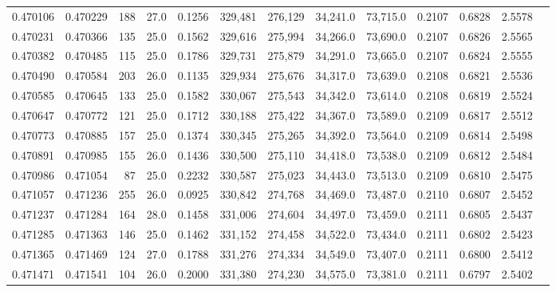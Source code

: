 \begin{tabular}{rrrrrrrrrrrrr}
0.470106 & 0.470229 &   188 & 27.0 &                                     0.1256 & 329,481 & 276,129 &  34,241.0 &  73,715.0 & 0.2107 & 0.6828 & 2.5578 \\
0.470231 & 0.470366 &   135 & 25.0 &                                     0.1562 & 329,616 & 275,994 &  34,266.0 &  73,690.0 & 0.2107 & 0.6826 & 2.5565 \\
0.470382 & 0.470485 &   115 & 25.0 &                                     0.1786 & 329,731 & 275,879 &  34,291.0 &  73,665.0 & 0.2107 & 0.6824 & 2.5555 \\
0.470490 & 0.470584 &   203 & 26.0 &                                     0.1135 & 329,934 & 275,676 &  34,317.0 &  73,639.0 & 0.2108 & 0.6821 & 2.5536 \\
0.470585 & 0.470645 &   133 & 25.0 &                                     0.1582 & 330,067 & 275,543 &  34,342.0 &  73,614.0 & 0.2108 & 0.6819 & 2.5524 \\
0.470647 & 0.470772 &   121 & 25.0 &                                     0.1712 & 330,188 & 275,422 &  34,367.0 &  73,589.0 & 0.2109 & 0.6817 & 2.5512 \\
0.470773 & 0.470885 &   157 & 25.0 &                                     0.1374 & 330,345 & 275,265 &  34,392.0 &  73,564.0 & 0.2109 & 0.6814 & 2.5498 \\
0.470891 & 0.470985 &   155 & 26.0 &                                     0.1436 & 330,500 & 275,110 &  34,418.0 &  73,538.0 & 0.2109 & 0.6812 & 2.5484 \\
0.470986 & 0.471054 &    87 & 25.0 &                                     0.2232 & 330,587 & 275,023 &  34,443.0 &  73,513.0 & 0.2109 & 0.6810 & 2.5475 \\
0.471057 & 0.471236 &   255 & 26.0 &                                     0.0925 & 330,842 & 274,768 &  34,469.0 &  73,487.0 & 0.2110 & 0.6807 & 2.5452 \\
0.471237 & 0.471284 &   164 & 28.0 &                                     0.1458 & 331,006 & 274,604 &  34,497.0 &  73,459.0 & 0.2111 & 0.6805 & 2.5437 \\
0.471285 & 0.471363 &   146 & 25.0 &                                     0.1462 & 331,152 & 274,458 &  34,522.0 &  73,434.0 & 0.2111 & 0.6802 & 2.5423 \\
0.471365 & 0.471469 &   124 & 27.0 &                                     0.1788 & 331,276 & 274,334 &  34,549.0 &  73,407.0 & 0.2111 & 0.6800 & 2.5412 \\
0.471471 & 0.471541 &   104 & 26.0 &                                     0.2000 & 331,380 & 274,230 &  34,575.0 &  73,381.0 & 0.2111 & 0.6797 & 2.5402 \\

\end{tabular}
